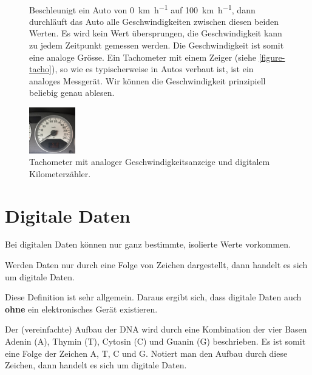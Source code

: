 \begin{example}
~
\begin{figure}[htb]
\begin{minipage}[t]{0.65\textwidth}
\vspace{0pt} 
Beschleunigt ein Auto von  \qty[per-mode = fraction]{0}{\km\per\hour} auf  \qty[per-mode = fraction]{100}{\km\per\hour}, dann durchläuft das Auto alle Geschwindigkeiten zwischen diesen beiden Werten. Es wird kein Wert übersprungen, die Geschwindigkeit kann zu jedem Zeitpunkt gemessen werden. Die Geschwindigkeit ist somit eine analoge Grösse. Ein Tachometer mit einem Zeiger (siehe \autoref{figure-tacho}), so wie es typischerweise in Autos verbaut ist, ist ein analoges Messgerät. Wir können die Geschwindigkeit prinzipiell beliebig genau ablesen.
\end{minipage}
\hfill
\begin{minipage}[t]{0.3\textwidth}
\vspace{0pt} 
\centering
\includegraphics[height=2cm]{tacho.jpg}
\caption{Tachometer mit analoger Geschwindigkeitsanzeige und digitalem Kilometerzähler.}
\label{figure-tacho}
\end{minipage}
\end{figure}

\end{example}

\section{Digitale Daten}

Bei digitalen Daten können nur ganz bestimmte, isolierte Werte vorkommen.

\begin{definition}
Werden Daten nur durch eine Folge von Zeichen dargestellt, dann handelt es sich um digitale Daten.
\end{definition}

Diese Definition ist sehr allgemein. Daraus ergibt sich, dass digitale Daten auch \textbf{ohne} ein elektronisches Gerät existieren.

\begin{example}
Der (vereinfachte) Aufbau der \ac{DNA} wird durch eine Kombination der vier Basen Adenin (A), Thymin (T), Cytosin (C) und Guanin (G) beschrieben. Es ist somit eine Folge der Zeichen A, T, C und G. Notiert man den Aufbau durch diese Zeichen, dann handelt es sich um digitale Daten.
\end{example}

